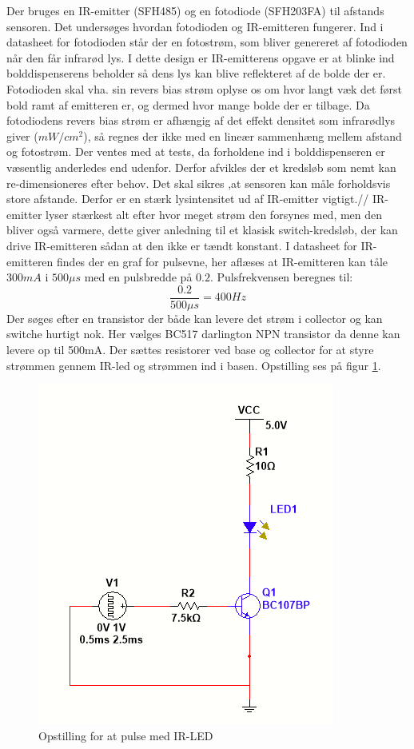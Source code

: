 Der bruges en IR-emitter (SFH485) og en fotodiode (SFH203FA) til afstands sensoren. Det undersøges hvordan fotodioden og IR-emitteren fungerer. Ind i datasheet for fotodioden står der en fotostrøm, som bliver genereret af fotodioden når den får infrarød lys. I dette design er IR-emitterens opgave er at blinke ind bolddispenserens beholder så dens lys kan blive reflekteret af de bolde der er. Fotodioden skal vha. sin revers bias strøm oplyse os om hvor langt væk det først bold ramt af emitteren er, og dermed hvor mange bolde der er tilbage. Da fotodiodens revers bias strøm er afhængig af det effekt densitet som infrarødlys giver ($mW/cm^2$), så regnes der ikke med en lineær sammenhæng mellem afstand og fotostrøm.
Der ventes med at tests, da forholdene ind i bolddispenseren er væsentlig anderledes end udenfor. Derfor afvikles der et kredsløb som nemt kan re-dimensioneres efter behov. Det skal sikres ,at sensoren kan måle forholdsvis store afstande. Derfor er en stærk lysintensitet ud af IR-emitter vigtigt.//
IR-emitter lyser stærkest alt efter hvor meget strøm den forsynes med, men den bliver også varmere, dette giver anledning til et klasisk switch-kredsløb, der kan drive IR-emitteren sådan at den ikke er tændt konstant. I datasheet for IR-emitteren findes der en graf for pulsevne, her aflæses at IR-emitteren kan tåle $300mA$ i $500\mu s$ med en pulsbredde på $0.2$. Pulsfrekvensen beregnes til:
\[\frac{0.2}{500\mu s}=400Hz\]
Der søges efter en transistor der både kan levere det strøm i collector og kan switche hurtigt nok. Her vælges BC517 darlington NPN transistor da denne kan levere op til 500mA. Der sættes resistorer ved base og collector for at styre strømmen gennem IR-led og strømmen ind i basen. Opstilling ses på figur \ref{fig:IRLEDpuls}.
\begin{figure}[H]
    \centering
    \includegraphics{Rapport/BallDispenser/BallCountSensor/graphics/Opstilling1.png}
    \caption{Opstilling for at pulse med IR-LED}
    \label{fig:IRLEDpuls}
\end{figure}

